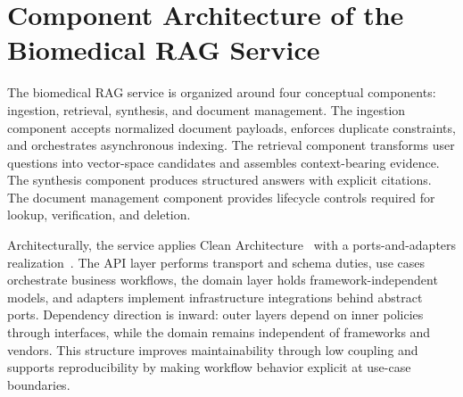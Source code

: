 \section{Component Architecture of the Biomedical RAG Service}

The biomedical RAG service is organized around four conceptual components: ingestion, retrieval, synthesis, and document management. The ingestion component accepts normalized document payloads, enforces duplicate constraints, and orchestrates asynchronous indexing. The retrieval component transforms user questions into vector-space candidates and assembles context-bearing evidence. The synthesis component produces structured answers with explicit citations. The document management component provides lifecycle controls required for lookup, verification, and deletion.

Architecturally, the service applies Clean Architecture~\cite{martin2017cleanarchitecture} with a ports-and-adapters realization~\cite{cockburn2005hexagonal}. The API layer performs transport and schema duties, use cases orchestrate business workflows, the domain layer holds framework-independent models, and adapters implement infrastructure integrations behind abstract ports. Dependency direction is inward: outer layers depend on inner policies through interfaces, while the domain remains independent of frameworks and vendors. This structure improves maintainability through low coupling and supports reproducibility by making workflow behavior explicit at use-case boundaries.

